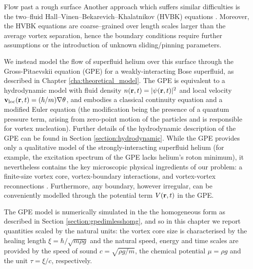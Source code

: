 \begin{chapter}{\label{cha:afm}Flow past a rough surface}
Another approach which suffers similar difficulties \cite{Henderson} is
the two--fluid Hall--Vinen--Bekarevich--Khalatnikov (HVBK)
equations \cite{Salort2011,Salort2012}. Moreover, the HVBK equations are coarse--grained over
length scales larger than the average vortex separation, hence the
boundary conditions require further assumptions or the introduction of
unknown sliding/pinning parameters.


We instead model the flow of superfluid helium over this surface through the Gross-Pitaevskii equation (GPE) \cite{RobertsBerloff} for a weakly-interacting Bose superfluid, as described in Chapter \ref{cha:theoretical_model}. The GPE is equivalent to a hydrodynamic model with fluid density $n({\bf r},t)=|\psi({\bf r},t)|^2$ and local velocity ${\bf v}_{\rm loc}({\bf r},t)=(\hbar/m)\nabla \theta$, and embodies a classical 
continuity equation and a modified Euler equation (the modification being the presence of a quantum pressure term, arising from zero-point motion of the particles {and is responsible for vortex nucleation}). Further details of the hydrodynamic description of the GPE can be found in Section \ref{section:hydrodynamic}.
While the GPE provides only a qualitative model of the strongly-interacting superfluid helium (for example, the excitation spectrum of the GPE lacks helium's roton minimum), it nevertheless contains the key microscopic physical ingredients of our problem: a finite-size vortex core, vortex-boundary interactions, and vortex-vortex reconnections \cite{RobertsBerloff}.  Furthermore, any boundary, however irregular, can be conveniently modelled through the potential term $V({\bf r},t)$ in the GPE.

The GPE model is numerically simulated in the the homogeneous form as described in Section \ref{section:gpedimlesshomg}, and so in this chapter we report quantities scaled by the natural units: the vortex core size is characterised by the healing length $\xi=\hbar/\sqrt{m \rho g}$ and the natural speed, energy and time scales are provided by the speed of sound $c=\sqrt{\rho g/m}$, the chemical potential $\mu=\rho g$ and the unit $\tau=\xi/c$, respectively. 


\end{chapter}
